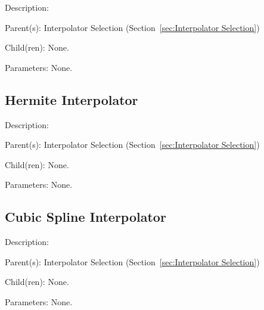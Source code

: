 \begin{list}{}
  {\setlength{\leftmargin}{1.0in}
   \setlength{\labelwidth}{0.75in}
   \setlength{\labelsep}{0.125in}}
  \item[Description:]
  \item[Parent(s):]
    Interpolator Selection (Section~\ref{sec:Interpolator Selection})
  \item[Child(ren):]
    None. 
  \item[Parameters:]
    None. 
\end{list}

\subsection{Hermite Interpolator}
\label{sec:Hermite Interpolator}

\begin{list}{}
  {\setlength{\leftmargin}{1.0in}
   \setlength{\labelwidth}{0.75in}
   \setlength{\labelsep}{0.125in}}
  \item[Description:]
  \item[Parent(s):]
    Interpolator Selection (Section~\ref{sec:Interpolator Selection})
  \item[Child(ren):]
    None. 
  \item[Parameters:]
    None. 
\end{list}

\subsection{Cubic Spline Interpolator}
\label{sec:Cubic Spline Interpolator}

\begin{list}{}
  {\setlength{\leftmargin}{1.0in}
   \setlength{\labelwidth}{0.75in}
   \setlength{\labelsep}{0.125in}}
  \item[Description:]
  \item[Parent(s):]
    Interpolator Selection (Section~\ref{sec:Interpolator Selection})
  \item[Child(ren):]
    None. 
  \item[Parameters:]
    None. 
\end{list}

